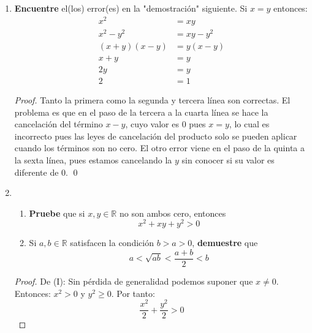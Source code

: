 \documentclass[12pt]{article}
\begin{document}
\begin{enumerate}
\begin{proof}
        De (XV): Es análogo a (XIV).
        \qed
    \end{proof}
    \item \textbf{Encuentre} el(los) error(es) en la "demostración" siguiente. Si $x=y$ entonces:
    \begin{equation*}
        \begin{split}
            x^2 &= xy \\
            x^2-y^2&=xy-y^2 \\
            \left(x+y\right)\left(x-y\right)&=y\left(x-y\right) \\
            x+y&=y \\
            2y&=y \\
            2&=1
        \end{split}
    \end{equation*}
    \begin{proof}
        Tanto la primera como la segunda y tercera línea son correctas. El problema es que en el paso de la tercera a la cuarta línea se hace la cancelación del término $x-y$, cuyo valor es 0 pues $x=y$, lo cual es incorrecto pues las leyes de cancelación del producto solo se pueden aplicar cuando los términos son no cero. El otro error viene en el paso de la quinta a la sexta línea, pues estamos cancelando la $y$ sin conocer si su valor es diferente de 0.
        \qed
    \end{proof}
    \item 
        \begin{enumerate}
            \item \textbf{Pruebe} que si $x,y\in\mathbb{R}$ no son ambos cero, entonces
                \begin{equation*}
                    x^2+xy+y^2>0
                \end{equation*}
            \item Si $a,b\in\mathbb{R}$ satisfacen la condición $b>a>0$, \textbf{demuestre} que
            \begin{equation*}
                a<\sqrt{ab}<\frac{a+b}{2}<b
            \end{equation*}
        \end{enumerate}
        \begin{proof}
            De (I): Sin pérdida de generalidad podemos suponer que $x\neq0$. Entonces: $x^2>0$ y $y^2\geq0$. Por tanto:
            \begin{equation*}
                \frac{x^2}{2}+\frac{y^2}{2}>0
            \end{equation*}

\end{proof}
\end{enumerate}
\end{document}

